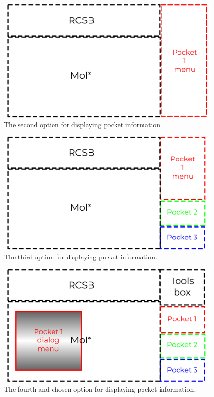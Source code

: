 \begin{figure}
    \centering
    \includegraphics[width=1\linewidth]{img/dialog_2-svg.pdf}
    \caption{The second option for displaying pocket information.}
    \label{fig:figure-2}
\end{figure}

\begin{figure}
	\centering
	\includegraphics[width=1\linewidth]{img/dialog_3-svg.pdf}
	\caption{The third option for displaying pocket information.}
	\label{fig:figure-3}
\end{figure}

\begin{figure}
	\centering
	\includegraphics[width=1\linewidth]{img/dialog_4-svg.pdf}
	\caption{The fourth and chosen option for displaying pocket information.}
	\label{fig:dialog-4}
\end{figure}
